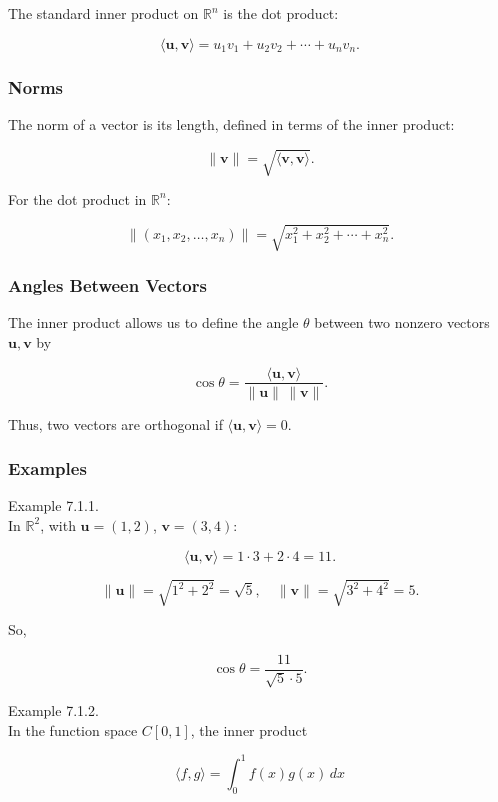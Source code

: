 \documentclass[
  12pt,
  a4paper,
]{article}
\begin{document}
The standard inner product on \(\mathbb{R}^n\) is the dot product:

\[\langle \mathbf{u}, \mathbf{v} \rangle = u_1 v_1 + u_2 v_2 + \cdots + u_n v_n.\]

\subsubsection{Norms}\label{norms}

The norm of a vector is its length, defined in terms of the inner
product:

\[\|\mathbf{v}\| = \sqrt{\langle \mathbf{v}, \mathbf{v} \rangle}.\]

For the dot product in \(\mathbb{R}^n\):

\[\|(x_1, x_2, \dots, x_n)\| = \sqrt{x_1^2 + x_2^2 + \cdots + x_n^2}.\]

\subsubsection{Angles Between Vectors}\label{angles-between-vectors-2}

The inner product allows us to define the angle \(\theta\) between two
nonzero vectors \(\mathbf{u}, \mathbf{v}\) by

\[\cos \theta = \frac{\langle \mathbf{u}, \mathbf{v} \rangle}{\|\mathbf{u}\| \, \|\mathbf{v}\|}.\]

Thus, two vectors are orthogonal if
\(\langle \mathbf{u}, \mathbf{v} \rangle = 0\).

\subsubsection{Examples}\label{examples-6}

Example 7.1.1.\\
In \(\mathbb{R}^2\), with \(\mathbf{u} = (1,2)\),
\(\mathbf{v} = (3,4)\):

\[\langle \mathbf{u}, \mathbf{v} \rangle = 1\cdot 3 + 2\cdot 4 = 11.\]

\[\|\mathbf{u}\| = \sqrt{1^2 + 2^2} = \sqrt{5}, \quad \|\mathbf{v}\| = \sqrt{3^2 + 4^2} = 5.\]

So,

\[\cos \theta = \frac{11}{\sqrt{5}\cdot 5}.\]

Example 7.1.2.\\
In the function space \(C[0,1]\), the inner product

\[\langle f, g \rangle = \int_0^1 f(x) g(x)\, dx\]
\end{document}
